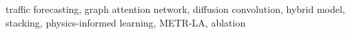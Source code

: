 \documentclass[conference]{IEEEtran}
\begin{document}
\begin{IEEEkeywords}
traffic forecasting, graph attention network, diffusion convolution, hybrid model, stacking, physics-informed learning, METR-LA, ablation
\end{IEEEkeywords}








\end{document}

